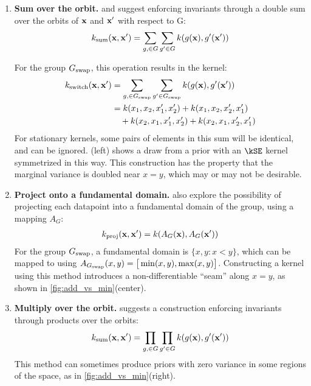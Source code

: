\begin{enumerate}

\item {\bf Sum over the orbit.} 
\citet{ginsbourger2012argumentwise} and \citet{kondor2008group} suggest enforcing invariants through a double sum over the orbits of ${\bf{x}}$ and ${\bf{x}}'$ with respect to G:
%
\begin{align}
k_\textnormal{sum}({\bf{x}}, {\bf{x}}') = \sum_{g, \in G} \sum_{g' \in G} k( g( {\bf{x}} ), g'( {\bf{x}}') )
\end{align}

For the group $G_\textnormal{swap}$, this operation results in the kernel:
%
\begin{align}
k_\textnormal{switch}({\bf{x}}, {\bf{x}}')
& = \sum_{g, \in G_\textnormal{swap}} \sum_{g' \in G_\textnormal{swap}} k( g( {\bf{x}} ), g'( {\bf{x}}') ) \\
& = k(x_1, x_2, x_1', x_2') + k(x_1, x_2, x_2', x_1')  \nonumber \\ 
& \quad + k(x_2, x_1, x_1', x_2') + k(x_2, x_1, x_2', x_1')
\end{align}
%
For stationary kernels, some pairs of elements in this sum will be identical, and can be ignored.
(left) shows a draw from a \gp{} prior with an $\kSE$ kernel symmetrized in this way.
This construction has the property that the marginal variance is doubled near $x = y$, which may or may not be desirable.



\item {\bf Project onto a fundamental domain.}
\citet{Invariances13} also explore the possibility of projecting each datapoint into a fundamental domain of the group, using a mapping $A_G$:
%
\begin{align}
k_\textnormal{proj}({\bf{x}}, {\bf{x}}') = k( A_G({\bf{x}}), A_G( {\bf{x}}') )
\end{align}
%
For the group $G_\textnormal{swap}$, a fundamental domain is $\{x, y : x < y\}$, which can be mapped to using $A_{G_\textnormal{swap}}( x, y ) = \big[ \min(x,y), \max(x,y) \big]$.
Constructing a kernel using this method introduces a non-differentiable  ``seam'' along $x = y$, as shown in \cref{fig:add_vs_min}(center).

\item {\bf Multiply over the orbit.}
\citet{adams2013product} suggests a construction enforcing invariants through products over the orbits:
%
\begin{align}
k_\textnormal{sum}({\bf{x}}, {\bf{x}}') = \prod_{g, \in G} \prod_{g' \in G} k( g( {\bf{x}} ), g'( {\bf{x}}') )
\end{align}
%
This method can sometimes produce \gp{} priors with zero variance in some regions of the space, as in \cref{fig:add_vs_min}(right).
\end{enumerate}
